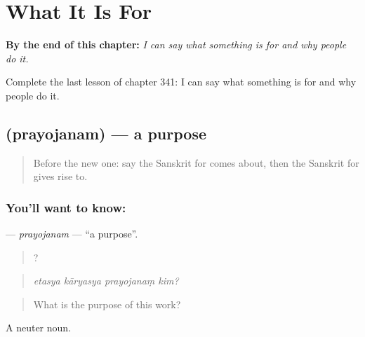 
\chapter{What It Is For}
\label{ch:sa-what-it-is-for}

\begin{chapteropening}
\textbf{By the end of this chapter:} \emph{I can say what something is for and why people do it.}

Complete the last lesson of chapter 341: I can say what something is for and why people do it.
\end{chapteropening}

\section[\texorpdfstring{\sk{प्रयोजनम्} (prayojanam)}{प्रयोजनम् (prayojanam)}]{ (prayojanam) — a purpose}

\label{lesson:SA-C341-prayojanam}



\begin{quote}
Before the new one: say the Sanskrit for comes about, then the Sanskrit for gives rise to.
\end{quote}

\subsection*{You'll want to know: }
\textbf{} — \emph{prayojanam} — \textquotedblleft{}a purpose\textquotedblright{}.

\begin{quote}
   ?
\end{quote}

\begin{quote}
\emph{etasya kāryasya prayojanaṃ kim?}
\end{quote}

\begin{quote}
What is the purpose of this work?
\end{quote}

A neuter noun.

